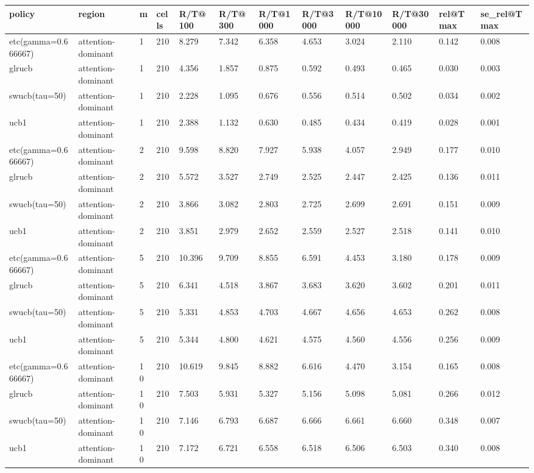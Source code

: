 \begin{tabular}{llllllllllll}
\toprule
policy & region & m & cells & R/T@100 & R/T@300 & R/T@1000 & R/T@3000 & R/T@10000 & R/T@30000 & rel@Tmax & se\_rel@Tmax \\
\midrule
etc(gamma=0.666667) & attention-dominant & 1 & 210 & 8.279 & 7.342 & 6.358 & 4.653 & 3.024 & 2.110 & 0.142 & 0.008 \\
glrucb & attention-dominant & 1 & 210 & 4.356 & 1.857 & 0.875 & 0.592 & 0.493 & 0.465 & 0.030 & 0.003 \\
swucb(tau=50) & attention-dominant & 1 & 210 & 2.228 & 1.095 & 0.676 & 0.556 & 0.514 & 0.502 & 0.034 & 0.002 \\
ucb1 & attention-dominant & 1 & 210 & 2.388 & 1.132 & 0.630 & 0.485 & 0.434 & 0.419 & 0.028 & 0.001 \\
etc(gamma=0.666667) & attention-dominant & 2 & 210 & 9.598 & 8.820 & 7.927 & 5.938 & 4.057 & 2.949 & 0.177 & 0.010 \\
glrucb & attention-dominant & 2 & 210 & 5.572 & 3.527 & 2.749 & 2.525 & 2.447 & 2.425 & 0.136 & 0.011 \\
swucb(tau=50) & attention-dominant & 2 & 210 & 3.866 & 3.082 & 2.803 & 2.725 & 2.699 & 2.691 & 0.151 & 0.009 \\
ucb1 & attention-dominant & 2 & 210 & 3.851 & 2.979 & 2.652 & 2.559 & 2.527 & 2.518 & 0.141 & 0.010 \\
etc(gamma=0.666667) & attention-dominant & 5 & 210 & 10.396 & 9.709 & 8.855 & 6.591 & 4.453 & 3.180 & 0.178 & 0.009 \\
glrucb & attention-dominant & 5 & 210 & 6.341 & 4.518 & 3.867 & 3.683 & 3.620 & 3.602 & 0.201 & 0.011 \\
swucb(tau=50) & attention-dominant & 5 & 210 & 5.331 & 4.853 & 4.703 & 4.667 & 4.656 & 4.653 & 0.262 & 0.008 \\
ucb1 & attention-dominant & 5 & 210 & 5.344 & 4.800 & 4.621 & 4.575 & 4.560 & 4.556 & 0.256 & 0.009 \\
etc(gamma=0.666667) & attention-dominant & 10 & 210 & 10.619 & 9.845 & 8.882 & 6.616 & 4.470 & 3.154 & 0.165 & 0.008 \\
glrucb & attention-dominant & 10 & 210 & 7.503 & 5.931 & 5.327 & 5.156 & 5.098 & 5.081 & 0.266 & 0.012 \\
swucb(tau=50) & attention-dominant & 10 & 210 & 7.146 & 6.793 & 6.687 & 6.666 & 6.661 & 6.660 & 0.348 & 0.007 \\
ucb1 & attention-dominant & 10 & 210 & 7.172 & 6.721 & 6.558 & 6.518 & 6.506 & 6.503 & 0.340 & 0.008 \\

\end{tabular}
